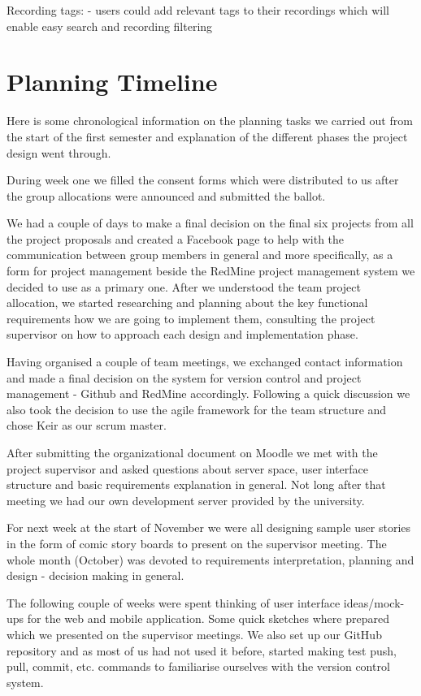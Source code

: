 \documentclass{l3proj}
\begin{document}
		Recording tags:
			- users could add relevant tags to their recordings which will enable easy search and recording filtering


\section{Planning Timeline}

Here is some chronological information on the planning tasks we carried out from the start of the first semester and explanation of the different phases the project design went through.

During week one we filled the consent forms which were distributed to us after the group allocations were announced and submitted the ballot.

We had a couple of days to make a final decision on the final six projects from all the project proposals and created a Facebook page to help with the communication between group members in general and more specifically, as a form for project management beside the RedMine project management system we decided to use as a primary one.
After we understood the team project allocation, we started researching and planning about the key functional requirements how we are going to implement them, consulting the project supervisor on how to approach each design and implementation phase.

Having organised a couple of team meetings, we exchanged contact information and made a final decision on the system for version control and project management - Github and RedMine accordingly. Following a quick discussion we also took the decision to use the agile framework for the team structure and chose Keir as our scrum master.

After submitting the organizational document on Moodle we met with the project supervisor and asked questions about server space, user interface structure and basic requirements explanation in general. Not long after that meeting we had our own development server provided by the university.

For next week at the start of November we were all designing sample user stories in the form of comic story boards to present on the supervisor meeting. The whole month (October) was devoted to requirements interpretation, planning and design - decision making in general.

The following couple of weeks were spent thinking of user interface ideas/mock-ups for the web and mobile application. Some quick sketches where prepared which we presented on the supervisor meetings. We also set up our GitHub repository and as most of us had not used it before, started making test push, pull, commit, etc. commands to familiarise ourselves with the version control system.
\end{document}
